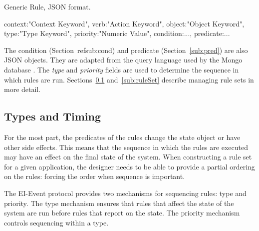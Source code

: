 \documentclass{article}
\begin{document}
  \begin{algorithm}
    \caption{Generic Rule, JSON format.}
    \label{json:Rule}
    \begin{listing}
      {
        context:"Context Keyword",
        verb:"Action Keyword",
        object:"Object Keyword",
        type:"Type Keyword",
        priority:"Numeric Value",
        condition:{...},
        predicate:{...}
      }
  \end{listing}
  \end{algorithm}
  
  The condition (Section~ref{sub:cond}) and predicate
  (Section~\ref{sub:pred}) are also JSON objects.  They are adapted
  from the query language used by the Mongo database \cite{mongo}.
  The \textit{type} and \textit{priority} fields are used to determine
  the sequence in which rules are run.  Sections~\ref{sub:types}
  and~\ref{sub:ruleSet} describe managing rule sets in more detail.

  \subsection{Types and Timing}
  \label{sub:types}

  For the most part, the predicates of the rules change the state
  object or have other side effects.  This means that the sequence in
  which the rules are executed may have an effect on the final state
  of the system.  When constructing a rule set for a given
  application, the designer needs to be able to provide a partial
  ordering on the rules:  forcing the order when sequence is
  important.

  The EI-Event protocol provides two mechanisms for sequencing rules:
  type and priority.  The type mechanism ensures that rules that
  affect the state of the system are run before rules that report on
  the state.  The priority mechanism controls sequencing within a
  type.
\end{document}
